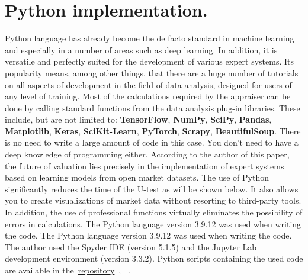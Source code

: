 \documentclass[]{scrreprt}
\begin{document}
\section{Python implementation.}\label{U-test-Python}
%
%
Python language has already become the de facto standard in machine learning and especially in a number of areas such as deep learning. In addition, it is versatile and perfectly suited for the development of various expert systems.  Its popularity means, among other things, that there are a huge number of tutorials on all aspects of development in the field of data analysis, designed for users of any level of training. Most of the calculations required by the appraiser can be done by calling standard functions from the data analysis plug-in libraries. These include, but are not limited to: \textbf{TensorFlow}, \textbf{NumPy}, \textbf{SciPy}, \textbf{Pandas}, \textbf{Matplotlib}, \textbf{Keras}, \textbf{SciKit-Learn}, \textbf{PyTorch}, \textbf{Scrapy}, \textbf{BeautifulSoup}. There is no need to write a large amount of code in this case. You don't need to have a deep knowledge of programming either. According to the author of this paper, the future of valuation lies precisely in the implementation of expert systems based on learning models from open market datasets. The use of Python significantly reduces the time of the U-test as will be shown below. It also allows you to create visualizations of market data without resorting to third-party tools. In addition, the use of professional functions virtually eliminates the possibility of errors in calculations. The Python language version 3.9.12 was used when writing the code. The Python language version 3.9.12 was used when writing the code. The author used the Spyder IDE (version 5.1.5) and the Jupyter Lab development environment (version 3.3.2). Python scripts containing the used code are available in the~\href{https://github.com/Kirill-Murashev/AI_for_valuers_Python_source/tree/main/Mann-Whitney-u-test}{repository}~\cite{Murashev:U-test.py}, ~\cite{Murashev:U-test.ipynb}.
\end{document}
